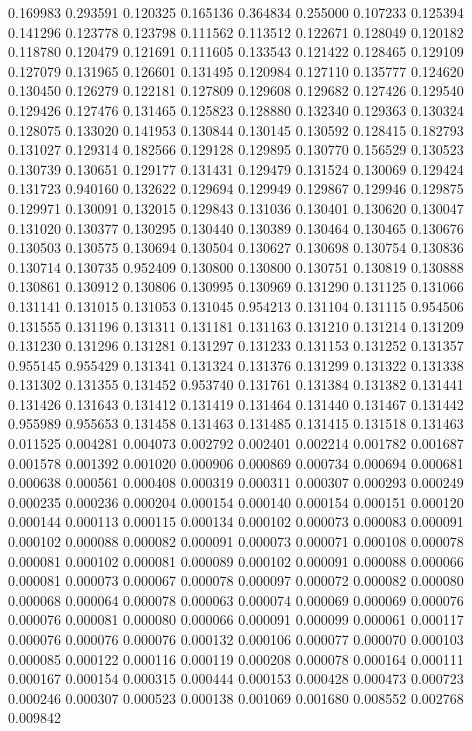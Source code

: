 0.169983
0.293591
0.120325
0.165136
0.364834
0.255000
0.107233
0.125394
0.141296
0.123778
0.123798
0.111562
0.113512
0.122671
0.128049
0.120182
0.118780
0.120479
0.121691
0.111605
0.133543
0.121422
0.128465
0.129109
0.127079
0.131965
0.126601
0.131495
0.120984
0.127110
0.135777
0.124620
0.130450
0.126279
0.122181
0.127809
0.129608
0.129682
0.127426
0.129540
0.129426
0.127476
0.131465
0.125823
0.128880
0.132340
0.129363
0.130324
0.128075
0.133020
0.141953
0.130844
0.130145
0.130592
0.128415
0.182793
0.131027
0.129314
0.182566
0.129128
0.129895
0.130770
0.156529
0.130523
0.130739
0.130651
0.129177
0.131431
0.129479
0.131524
0.130069
0.129424
0.131723
0.940160
0.132622
0.129694
0.129949
0.129867
0.129946
0.129875
0.129971
0.130091
0.132015
0.129843
0.131036
0.130401
0.130620
0.130047
0.131020
0.130377
0.130295
0.130440
0.130389
0.130464
0.130465
0.130676
0.130503
0.130575
0.130694
0.130504
0.130627
0.130698
0.130754
0.130836
0.130714
0.130735
0.952409
0.130800
0.130800
0.130751
0.130819
0.130888
0.130861
0.130912
0.130806
0.130995
0.130969
0.131290
0.131125
0.131066
0.131141
0.131015
0.131053
0.131045
0.954213
0.131104
0.131115
0.954506
0.131555
0.131196
0.131311
0.131181
0.131163
0.131210
0.131214
0.131209
0.131230
0.131296
0.131281
0.131297
0.131233
0.131153
0.131252
0.131357
0.955145
0.955429
0.131341
0.131324
0.131376
0.131299
0.131322
0.131338
0.131302
0.131355
0.131452
0.953740
0.131761
0.131384
0.131382
0.131441
0.131426
0.131643
0.131412
0.131419
0.131464
0.131440
0.131467
0.131442
0.955989
0.955653
0.131458
0.131463
0.131485
0.131415
0.131518
0.131463
0.011525
0.004281
0.004073
0.002792
0.002401
0.002214
0.001782
0.001687
0.001578
0.001392
0.001020
0.000906
0.000869
0.000734
0.000694
0.000681
0.000638
0.000561
0.000408
0.000319
0.000311
0.000307
0.000293
0.000249
0.000235
0.000236
0.000204
0.000154
0.000140
0.000154
0.000151
0.000120
0.000144
0.000113
0.000115
0.000134
0.000102
0.000073
0.000083
0.000091
0.000102
0.000088
0.000082
0.000091
0.000073
0.000071
0.000108
0.000078
0.000081
0.000102
0.000081
0.000089
0.000102
0.000091
0.000088
0.000066
0.000081
0.000073
0.000067
0.000078
0.000097
0.000072
0.000082
0.000080
0.000068
0.000064
0.000078
0.000063
0.000074
0.000069
0.000069
0.000076
0.000076
0.000081
0.000080
0.000066
0.000091
0.000099
0.000061
0.000117
0.000076
0.000076
0.000076
0.000132
0.000106
0.000077
0.000070
0.000103
0.000085
0.000122
0.000116
0.000119
0.000208
0.000078
0.000164
0.000111
0.000167
0.000154
0.000315
0.000444
0.000153
0.000428
0.000473
0.000723
0.000246
0.000307
0.000523
0.000138
0.001069
0.001680
0.008552
0.002768
0.009842
